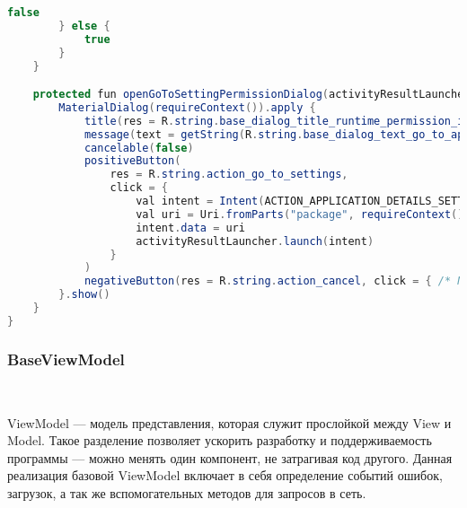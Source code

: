 \begin{lstlisting}[language=Java,label={lst:baseFragment},caption={Компонент BaseFragment}]
            false
        } else {
            true
        }
    }

    protected fun openGoToSettingPermissionDialog(activityResultLauncher: ActivityResultLauncher<Intent>) {
        MaterialDialog(requireContext()).apply {
            title(res = R.string.base_dialog_title_runtime_permission_is_denied)
            message(text = getString(R.string.base_dialog_text_go_to_application_settings))
            cancelable(false)
            positiveButton(
                res = R.string.action_go_to_settings,
                click = {
                    val intent = Intent(ACTION_APPLICATION_DETAILS_SETTINGS)
                    val uri = Uri.fromParts("package", requireContext().packageName, null)
                    intent.data = uri
                    activityResultLauncher.launch(intent)
                }
            )
            negativeButton(res = R.string.action_cancel, click = { /* Nothing */ })
        }.show()
    }
}
\end{lstlisting}

\subsubsection{BaseViewModel}~\par
ViewModel — модель представления, которая служит прослойкой между View и Model. Такое разделение позволяет ускорить разработку и поддерживаемость программы — можно менять один компонент, не затрагивая код другого. Данная реализация базовой ViewModel включает в себя определение событий ошибок, загрузок, а так же вспомогательных методов для запросов в сеть.

